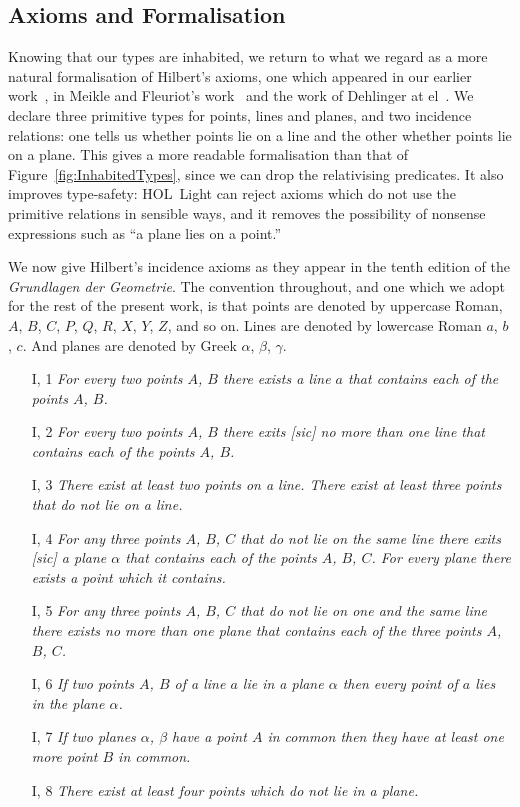 \subsection{Axioms and Formalisation}
Knowing that our types are inhabited, we return to what we regard as a more natural formalisation of Hilbert's axioms, one which appeared in our earlier work~\cite{ScottMScThesis}, in Meikle and Fleuriot's work~\cite{MeikleFleuriotFormalizingHilbert} and the work of Dehlinger at el~\cite{DehlingerFOG}. We declare three primitive types for points, lines and planes, and two incidence relations: one tells us whether points lie on a line and the other whether points lie on a plane. This gives a more readable formalisation than that of Figure~\ref{fig:InhabitedTypes}, since we can drop the relativising predicates. It also improves type-safety: HOL~Light can reject axioms which do not use the primitive relations in sensible ways, and it removes the possibility of nonsense expressions such as ``a plane lies on a point.''

We now give Hilbert's incidence axioms as they appear in the tenth edition of the \emph{Grundlagen der Geometrie}. The convention throughout, and one which we adopt for the rest of the present work, is that points are denoted by uppercase Roman, $A$, $B$, $C$, $P$, $Q$, $R$, $X$, $Y$, $Z$, and so on. Lines are denoted by lowercase Roman $a$, $b$, $c$. And planes are denoted by Greek $\alpha$, $\beta$, $\gamma$.
\begin{enumerate}
\item[I, 1] \emph{For every two points $A$, $B$ there exists a line $a$ that contains each of the points $A$, $B$.}
\item[I, 2] \emph{For every two points $A$, $B$ there exits [sic] no more than one line that contains each of the points $A$, $B$.}
\item[I, 3] \emph{There exist at least two points on a line. There exist at least three points that do not lie on a line.}
\item[I, 4] \emph{For any three points $A$, $B$, $C$ that do not lie on the same line there exits [sic] a plane $\alpha$ that contains each of the points $A$, $B$, $C$. For every plane there exists a point which it contains.}
\item[I, 5] \emph{For any three points $A$, $B$, $C$ that do not lie on one and the same line there exists no more than one plane that contains each of the three points $A$, $B$, $C$.}
\item[I, 6] \emph{If two points $A$, $B$ of a line $a$ lie in a plane $\alpha$ then every point of $a$ lies in the plane $\alpha$.}
\item[I, 7] \emph{If two planes $\alpha$, $\beta$ have a point $A$ in common then they have at least one more point $B$ in common.}
\item[I, 8] \emph{There exist at least four points which do not lie in a plane.}
\end{enumerate}

